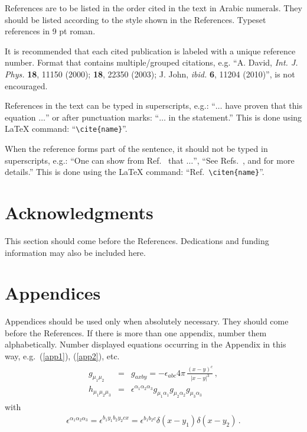 \documentclass{ws-ijmpa}
\begin{document}
References are to be listed in the order cited in the text in Arabic
numerals. They should be listed according to the style shown in the
References. Typeset references in 9 pt roman.

It is recommended that each cited publication is labeled with a unique reference number. Format that contains multiple/grouped citations, e.g. ``A. David, {\it Int. J. Phys.} {\bf 18}, 11150 (2000); {\bf 18}, 22350 (2003); J. John, {\it ibid.} {\bf 6}, 11204 (2010)'', is not encouraged.

References in the text can be typed in superscripts,
e.g.: ``$\ldots$ have proven\cite{autbk,edbk,rvo} that
this equation $\ldots$'' or after punctuation marks:
``$\ldots$ in the statement.\cite{rvo}'' This is
done using LaTeX command: ``\verb|\cite{name}|''.

When the reference forms part of the sentence, it should not
be typed in superscripts, e.g.: ``One can show from
Ref.~ that $\ldots$'', ``See
Refs.~, 
and  for more details.''
This is done using the LaTeX
command: ``Ref.~\verb|\citen{name}|''.

\section*{Acknowledgments}

This section should come before the References. Dedications and funding
information may also be included here.

\appendix

\section{Appendices}

Appendices should be used only when absolutely necessary. They
should come before the References. If there is more than one
appendix, number them alphabetically. Number displayed equations
occurring in the Appendix in this way, e.g.~(\ref{app1}),\break
(\ref{app2}), etc.
\begin{eqnarray}	%
\begin{array}{rcl}
g_{\mu_1\mu_2} &=& g_{axby}=-\displaystyle{\epsilon_{abc}}{4\pi}\,
\frac{(x-y)^c}{|x-y|^3}\,, \\[8pt]
h_{\mu_1\mu_2\mu_3} &=& \epsilon^{\alpha_1 \alpha_2 \alpha_3}
g_{\mu_1\alpha_1}g_{\mu_2\alpha_2}g_{\mu_3\alpha_3}
\end{array}
\label{app1}
\end{eqnarray}
with
\begin{eqnarray}	%
\epsilon^{\alpha_1 \alpha_2 \alpha_3} = \epsilon^{b_1y_1b_2y_2cx} =
\epsilon^{b_1b_2c}\delta(x-y_1)\delta(x-y_2)\,.
\label{app2}
\end{eqnarray}
\end{document}
